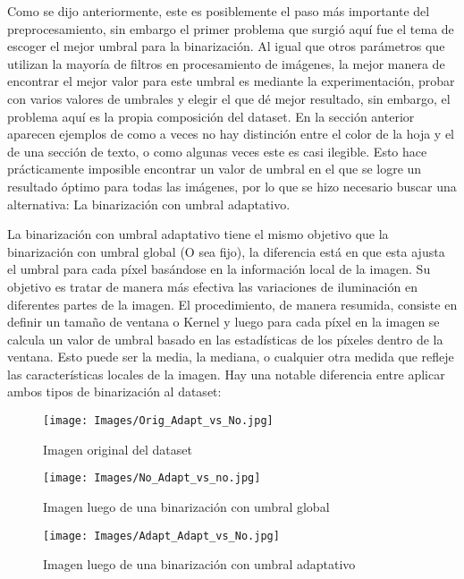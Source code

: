 \documentclass{article}
\begin{document}
Como se dijo anteriormente, este es posiblemente el paso más importante del preprocesamiento, sin embargo el primer problema que surgió aquí fue el tema de escoger el mejor umbral para la binarización. Al igual que otros parámetros que utilizan la mayoría de filtros en procesamiento de imágenes, la mejor manera de encontrar el mejor valor para este umbral es mediante la experimentación, probar con varios valores de umbrales y elegir el que dé mejor resultado, sin embargo, el problema aquí es la propia composición del dataset. En la sección anterior aparecen ejemplos de como a veces no hay distinción entre el color de la hoja y el de una sección de texto, o como algunas veces este es casi ilegible. Esto hace prácticamente imposible encontrar un valor de umbral en el que se logre un resultado óptimo para todas las imágenes, por lo que se hizo necesario buscar una alternativa: La binarización con umbral adaptativo.

La binarización con umbral adaptativo tiene el mismo objetivo que la binarización con umbral global (O sea fijo), la diferencia está en que esta ajusta el umbral para cada píxel basándose en la información local de la imagen. Su objetivo es tratar de manera más efectiva las variaciones de iluminación en diferentes partes de la imagen. El procedimiento, de manera resumida, consiste en definir un tamaño de ventana o Kernel y luego para cada píxel en la imagen se calcula un valor de umbral basado en las estadísticas de los píxeles dentro de la ventana. Esto puede ser la media, la mediana, o cualquier otra medida que refleje las características locales de la imagen. Hay una notable diferencia entre aplicar ambos tipos de binarización al dataset:

\begin{figure}[H]
    \centering
    \texttt{[image: Images/Orig\_Adapt\_vs\_No.jpg]}
    \caption{Imagen original del dataset}
    \label{fig:enter-label}
\end{figure}

\begin{figure}[H]
    \centering
    \texttt{[image: Images/No\_Adapt\_vs\_no.jpg]}
    \caption{Imagen luego de una binarización con umbral global}
    \label{fig:enter-label}
\end{figure}

\begin{figure}[H]
    \centering
    \texttt{[image: Images/Adapt\_Adapt\_vs\_No.jpg]}
    \caption{Imagen luego de una binarización con umbral adaptativo}
    \label{fig:enter-label}
\end{figure}
\end{document}
